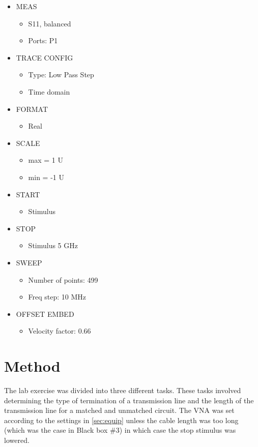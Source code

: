 \documentclass[12pt,a4paper]{article}
\begin{document}
\begin{itemize}
\item MEAS
  \begin{itemize}
  \item S11, balanced
  \item Ports: P1
  \end{itemize}
\item TRACE CONFIG
  \begin{itemize}
  \item Type: Low Pass Step
  \item Time domain
  \end{itemize}
\item FORMAT
  \begin{itemize}
  \item Real
  \end{itemize}
\item SCALE
  \begin{itemize}
  \item max = 1 U
  \item min = -1 U
  \end{itemize}
\item START
  \begin{itemize}
  \item Stimulus
  \end{itemize}
\item STOP
  \begin{itemize}
  \item Stimulus 5 GHz
  \end{itemize}
\item SWEEP
  \begin{itemize}
  \item Number of points: 499
  \item Freq step: 10 MHz
  \end{itemize}
\item OFFSET EMBED
  \begin{itemize}
  \item Velocity factor: 0.66
  \end{itemize}
\end{itemize}

\section{Method}
The lab exercise was divided into three different tasks. These tasks involved determining the type of termination of a transmission line and the length of the transmission line for a matched and unmatched circuit. The VNA was set according to the settings in \ref{sec:equip} unless the cable length was too long (which was the case in Black box \#3) in which case the stop stimulus was lowered.
\end{document}
